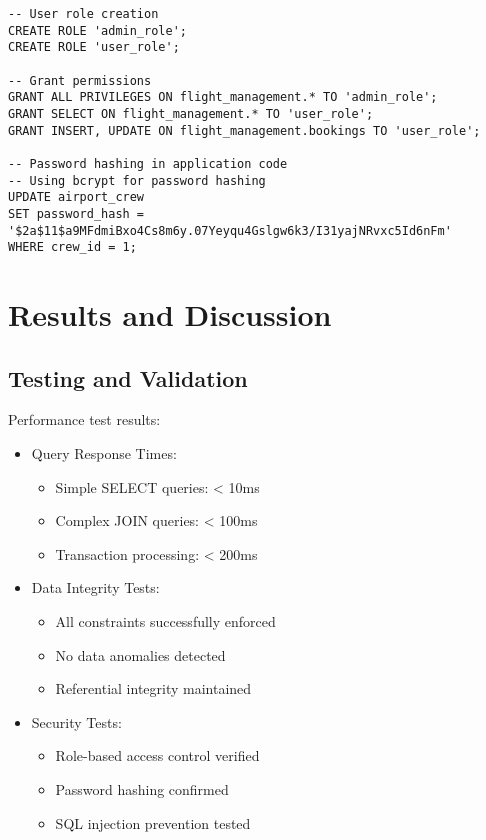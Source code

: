 \documentclass[a4paper,12pt]{article}
\begin{document}
\begin{lstlisting}[caption=Security Implementation]
-- User role creation
CREATE ROLE 'admin_role';
CREATE ROLE 'user_role';

-- Grant permissions
GRANT ALL PRIVILEGES ON flight_management.* TO 'admin_role';
GRANT SELECT ON flight_management.* TO 'user_role';
GRANT INSERT, UPDATE ON flight_management.bookings TO 'user_role';

-- Password hashing in application code
-- Using bcrypt for password hashing
UPDATE airport_crew 
SET password_hash = '$2a$11$a9MFdmiBxo4Cs8m6y.07Yeyqu4Gslgw6k3/I31yajNRvxc5Id6nFm'
WHERE crew_id = 1;
\end{lstlisting}

\section{Results and Discussion}
\subsection{Testing and Validation}
Performance test results:

\begin{itemize}
    \item Query Response Times:
    \begin{itemize}
        \item Simple SELECT queries: < 10ms
        \item Complex JOIN queries: < 100ms
        \item Transaction processing: < 200ms
    \end{itemize}
    \item Data Integrity Tests:
    \begin{itemize}
        \item All constraints successfully enforced
        \item No data anomalies detected
        \item Referential integrity maintained
    \end{itemize}
    \item Security Tests:
    \begin{itemize}
        \item Role-based access control verified
        \item Password hashing confirmed
        \item SQL injection prevention tested
    \end{itemize}
\end{itemize}
\end{document}
